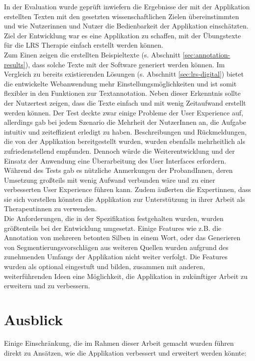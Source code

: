 In der Evaluation wurde geprüft inwiefern die Ergebnisse der mit der Applikation erstellten Texten mit den gesetzten wissenschaftlichen Zielen übereinstimmten und wie Nutzerinnen und Nutzer die Bedienbarkeit der Applikation einschätzten. Ziel der Entwicklung war es eine Applikation zu schaffen, mit der Übungstexte für die LRS Therapie einfach erstellt werden können.\\
Zum Einen zeigen die erstellten Beispieltexte (s. Abschnitt \ref{sec:annotation-results}), dass solche Texte mit der Software generiert werden können. Im Vergleich zu bereits existierenden Lösungen (s. Abschnitt \ref{sec:lrs-digital}) bietet die entwickelte Webanwendung mehr Einstellungsmöglichkeiten und ist somit flexibler in den Funktionen zur Textannotation. Neben dieser Erkenntnis sollte der Nutzertest zeigen, dass die Texte einfach und mit wenig Zeitaufwand erstellt werden können. Der Test deckte zwar einige Probleme der User Experience auf, allerdings gab bei jedem Szenario die Mehrheit der NutzerInnen an, die Aufgabe intuitiv und zeiteffizient erledigt zu haben. Beschreibungen und Rückmeldungen, die von der Applikation bereitgestellt wurden, wurden ebenfalls mehrheitlich als zufriedenstellend empfunden. Dennoch würde die Weiterentwicklung und der Einsatz der Anwendung eine Überarbeitung des User Interfaces erfordern. Während des Tests gab es nützliche Anmerkungen der ProbandInnen, deren Umsetzung großteils mit wenig Aufwand verbunden wäre und zu einer verbesserten User Experience führen kann. Zudem äußerten die Expertinnen, dass sie sich vorstellen könnten die Applikation zur Unterstützung in ihrer Arbeit als Therapeutinnen zu verwenden.\\
Die Anforderungen, die in der Spezifikation festgehalten wurden, wurden größtenteils bei der Entwicklung umgesetzt. Einige Features wie z.B. die Annotation von mehreren betonten Silben in einem Wort, oder das Generieren von Segmentierungsvorschlägen aus weiteren Quellen wurden aufgrund des zunehmenden Umfangs der Applikation nicht weiter verfolgt. Die Features wurden als optional eingestuft und bilden, zusammen mit anderen, weiterführenden Ideen eine Möglichkeit, die Applikation in zukünftiger Arbeit zu erweitern und zu verbessern.

\section{Ausblick}

Einige Einschränkung, die im Rahmen dieser Arbeit gemacht wurden führen direkt zu Ansätzen, wie die Applikation verbessert und erweitert werden könnte:


